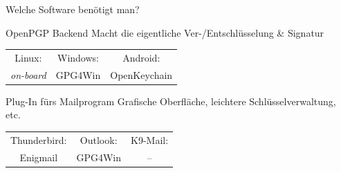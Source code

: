 \begin{frame}{Welche Software benötigt man?}
  \begin{block}{OpenPGP Backend}
    Macht die eigentliche Ver-/Entschlüsselung \& Signatur

    \vspace{1ex}
    \begin{tabular}{ccc}
      Linux:            & Windows: & Android:     \\
      \textit{on-board} & GPG4Win  & OpenKeychain \\
    \end{tabular}
  \end{block}
  \begin{block}{Plug-In fürs Mailprogram}
    Grafische Oberfläche, leichtere Schlüsselverwaltung, etc.

    \vspace{1ex}
    \begin{tabular}{ccc}
      Thunderbird: & Outlook: & K9-Mail: \\
      Enigmail     & GPG4Win  & --       \\
    \end{tabular}
  \end{block}
\end{frame}

\endinput
